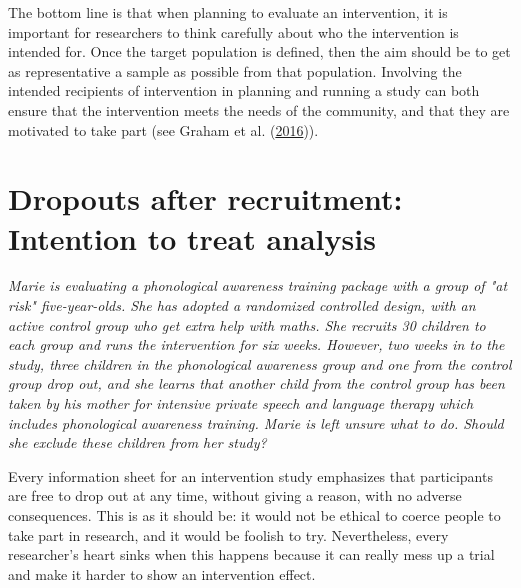 \documentclass{krantz}
\begin{document}
The bottom line is that when planning to evaluate an intervention, it is important for researchers to think carefully about who the intervention is intended for. Once the target population is defined, then the aim should be to get as representative a sample as possible from that population. Involving the intended recipients of intervention in planning and running a study can both ensure that the intervention meets the needs of the community, and that they are motivated to take part (see Graham et al. (\protect\hyperlink{ref-graham2016}{2016})).

\hypertarget{dropouts-after-recruitment-intention-to-treat-analysis}{%
\section{Dropouts after recruitment: Intention to treat analysis}\label{dropouts-after-recruitment-intention-to-treat-analysis}}

\begin{shaded}
\textit{Marie is evaluating a phonological awareness training package with a group of "at risk" five-year-olds. She has adopted a randomized controlled design, with an active control group who get extra help with maths. She recruits 30 children to each group and runs the intervention for six weeks. However, two weeks in to the study, three children in the phonological awareness group and one from the control group drop out, and she learns that another child from the control group has been taken by his mother for intensive private speech and language therapy which includes phonological awareness training. Marie is left unsure what to do. Should she exclude these children from her study?}
\end{shaded}

Every information sheet for an intervention study emphasizes that participants are free to drop out at any time, without giving a reason, with no adverse consequences. This is as it should be: it would not be ethical to coerce people to take part in research, and it would be foolish to try. Nevertheless, every researcher's heart sinks when this happens because it can really mess up a trial and make it harder to show an intervention effect. 
\end{document}
